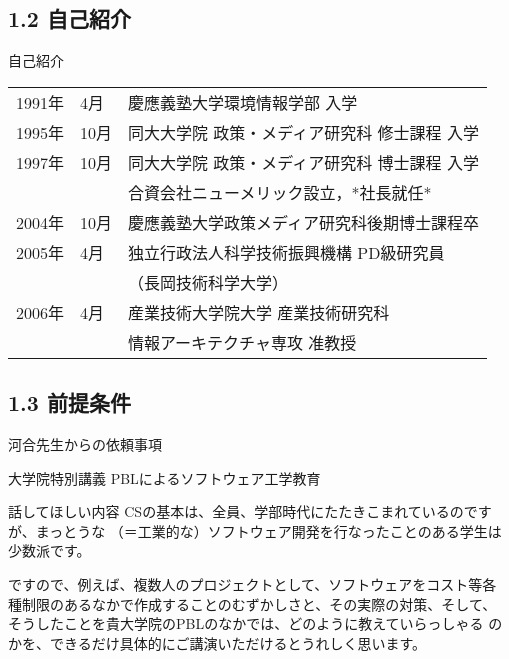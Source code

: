 \documentclass{beamer}
\begin{document}
\subsection{1.2 自己紹介}

\label{sec-1}
\begin{frame}[label=sec-1-1]{自己紹介}
\begin{center}
\begin{tabular}{lll}
1991年 & 4月 & 慶應義塾大学環境情報学部 入学\\
1995年 & \alert{10月} & 同大大学院 政策・メディア研究科 修士課程 入学\\
1997年 & 10月 & 同大大学院 政策・メディア研究科 博士課程 入学\\
 &  & 合資会社ニューメリック設立，*社長就任*\\
2004年 & 10月 & 慶應義塾大学政策メディア研究科後期博士課程卒\\
2005年 & 4月 & 独立行政法人科学技術振興機構 PD級研究員\\
 &  & （長岡技術科学大学）\\
2006年 & 4月 & 産業技術大学院大学 産業技術研究科\\
 &  & 情報アーキテクチャ専攻 准教授\\
\end{tabular}
\end{center}

\subsection{1.3 前提条件}

\end{frame}
\begin{frame}[label=sec-1-2]{河合先生からの依頼事項}
\begin{block}{大学院特別講義}
PBLによるソフトウェア工学教育
\end{block}
\begin{block}{話してほしい内容}
CSの基本は、全員、学部時代にたたきこまれているのですが、まっとうな
（＝工業的な）ソフトウェア開発を行なったことのある学生は少数派です。

ですので、例えば、複数人のプロジェクトとして、ソフトウェアをコスト等各
種制限のあるなかで作成することのむずかしさと、その実際の対策、そして、
そうしたことを貴大学院のPBLのなかでは、どのように教えていらっしゃる
のかを、できるだけ具体的にご講演いただけるとうれしく思います。
\end{block}
\end{frame}
\end{document}

